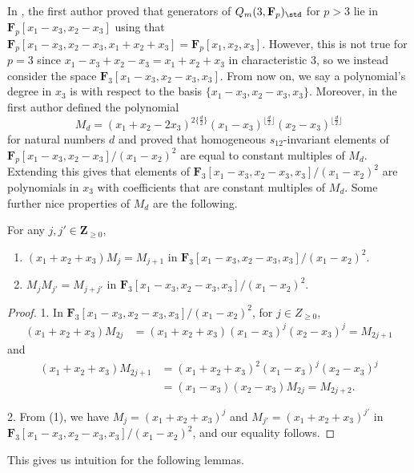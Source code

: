 In \cite{wang2022explicit}, the first author proved that generators of $Q_m(3,\mathbf{F}_p)_{\std}$ for $p>3$ lie in $\mathbf{F}_p[x_1-x_3,\allowbreak {x_2-x_3}]$ using that $\mathbf{F}_p[x_1-x_3,x_2-x_3,x_1+x_2+x_3]=\mathbf{F}_p[x_1,x_2,x_3]$. However, this is not true for $p=3$ since $x_1-x_3+x_2-x_3=x_1+x_2+x_3$ in characteristic $3$, so we instead consider the space $\mathbf{F}_3[x_1-x_3,x_2-x_3,x_3]$. From now on, we say a polynomial's degree in $x_3$ is with respect to the basis $\{x_1-x_3,x_2-x_3,x_3\}$. Moreover, in \cite{wang2022explicit} the first author defined the polynomial
\[M_d = (x_1+x_2-2x_3)^{2\{ \frac{d}{2}\}}(x_1-x_3)^{\lfloor\frac{d}{2}\rfloor}(x_2-x_3)^{\lfloor\frac{d}{2}\rfloor}\]
for natural numbers $d$ and proved that homogeneous $s_{12}$-invariant elements of $\mathbf{F}_p[x_1-x_3,x_2-x_3]/(x_1-x_2)^2$ are equal to constant multiples of $M_d$. Extending this gives that elements of $\mathbf{F}_3[x_1-x_3,x_2-x_3,x_3]/(x_1-x_2)^2$ are polynomials in $x_3$ with coefficients that are constant multiples of $M_d$. Some further nice properties of $M_d$ are the following.

\begin{Lemma}\label{M_dProps}
 For any $j,j'\in \mathbf{Z}_{\geq 0}$,
 \begin{enumerate}\itemsep=0pt
 \item[$1.$] $(x_1+x_2+x_3)M_j = M_{j+1}$ in $\mathbf{F}_3[x_1-x_3,x_2-x_3,x_3]/(x_1-x_2)^2$.
 \item[$2.$] $M_{j}M_{j'}=M_{j+j'}$ in $\mathbf{F}_3[x_1-x_3,x_2-x_3,x_3]/(x_1-x_2)^2$.
 \end{enumerate}
\end{Lemma}
\begin{proof}
1. In $\mathbf{F}_3[x_1-x_3,x_2-x_3,x_3]/(x_1-x_2)^2$, for $j\in Z_{\geq 0}$, \begin{align*}
 (x_1+x_2+x_3)M_{2j} &= (x_1+x_2+x_3)(x_1-x_3)^j(x_2-x_3)^j
 = M_{2j+1}
 \end{align*}
 and
 \begin{align*}
 (x_1+x_2+x_3)M_{2j+1} &= (x_1+x_2+x_3)^2(x_1-x_3)^j(x_2-x_3)^j \\
 &= (x_1-x_3)(x_2-x_3)M_{2j}
 = M_{2j+2}.
 \end{align*}

2. From (1), we have $M_j=(x_1+x_2+x_3)^j$ and $M_{j'}=(x_1+x_2+x_3)^{j'}$ in $\mathbf{F}_3[x_1-x_3,x_2-x_3,x_3]/(x_1-x_2)^2$, and our equality follows.
\end{proof}

This gives us intuition for the following lemmas.

